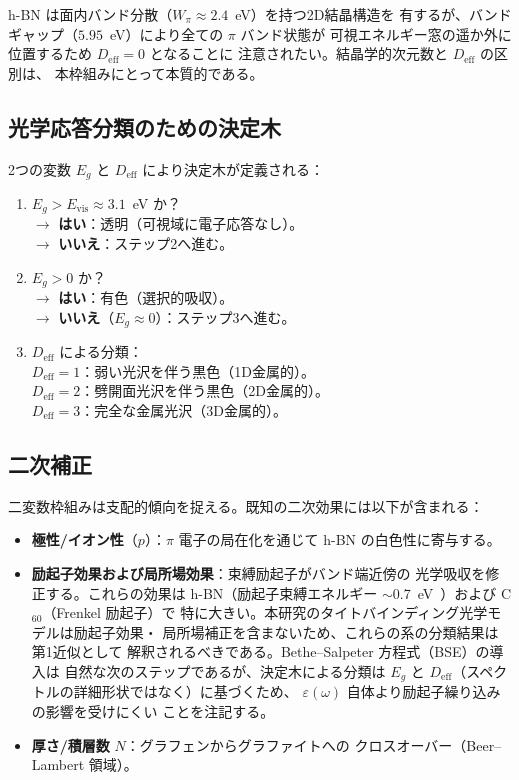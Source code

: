 \documentclass[twocolumn,showpacs,preprintnumbers,amsmath,amssymb,prb]{revtex4-2}
\begin{document}
h-BN は面内バンド分散（$W_\pi \approx 2.4$~eV）を持つ2D結晶構造を
有するが、バンドギャップ（$5.95$~eV）により全ての $\pi$ バンド状態が
可視エネルギー窓の遥か外に位置するため $D_\mathrm{eff} = 0$ となることに
注意されたい。結晶学的次元数と $D_\mathrm{eff}$ の区別は、
本枠組みにとって本質的である。

\subsection{光学応答分類のための決定木}
\label{sec:tree}

2つの変数 $E_g$ と $D_\mathrm{eff}$ により決定木が定義される：

\begin{enumerate}
  \item $E_g > E_\mathrm{vis} \approx 3.1$~eV か？\\
    $\to$ \textbf{はい}：透明（可視域に電子応答なし）。\\
    $\to$ \textbf{いいえ}：ステップ2へ進む。
  \item $E_g > 0$ か？\\
    $\to$ \textbf{はい}：有色（選択的吸収）。\\
    $\to$ \textbf{いいえ}（$E_g \approx 0$）：ステップ3へ進む。
  \item $D_\mathrm{eff}$ による分類：\\
    $D_\mathrm{eff} = 1$：弱い光沢を伴う黒色（1D金属的）。\\
    $D_\mathrm{eff} = 2$：劈開面光沢を伴う黒色（2D金属的）。\\
    $D_\mathrm{eff} = 3$：完全な金属光沢（3D金属的）。
\end{enumerate}

\subsection{二次補正}

二変数枠組みは支配的傾向を捉える。既知の二次効果には以下が含まれる：
\begin{itemize}
  \item \textbf{極性/イオン性}（$p$）：$\pi$ 電子の局在化を通じて
    h-BN の白色性に寄与する。
  \item \textbf{励起子効果および局所場効果}：束縛励起子がバンド端近傍の
    光学吸収を修正する。これらの効果は h-BN（励起子束縛エネルギー
    $\sim$0.7~eV~\cite{Arnaud2006}）および C$_{60}$（Frenkel 励起子）で
    特に大きい。本研究のタイトバインディング光学モデルは励起子効果・
    局所場補正を含まないため、これらの系の分類結果は第1近似として
    解釈されるべきである。Bethe--Salpeter 方程式（BSE）の導入は
    自然な次のステップであるが、決定木による分類は $E_g$ と
    $D_\mathrm{eff}$（スペクトルの詳細形状ではなく）に基づくため、
    $\varepsilon(\omega)$ 自体より励起子繰り込みの影響を受けにくい
    ことを注記する。
  \item \textbf{厚さ/積層数} $N$：グラフェンからグラファイトへの
    クロスオーバー（Beer--Lambert 領域）。
\end{itemize}
\end{document}

